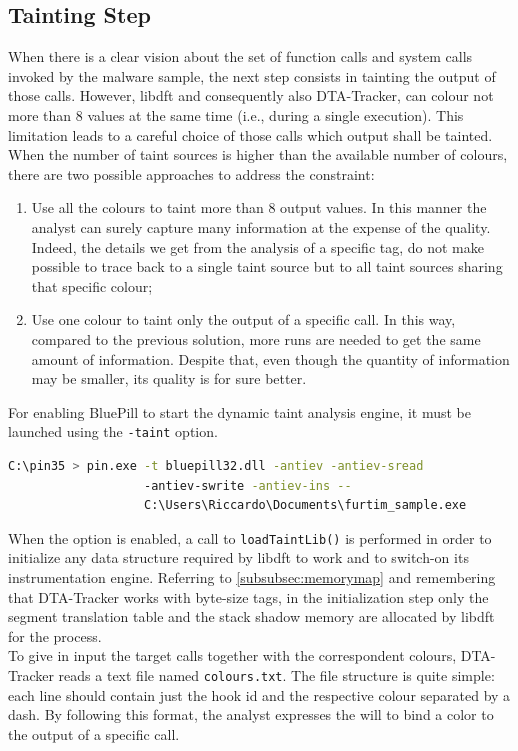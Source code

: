 \documentclass[LaM,binding=0.6cm]{sapthesis}
\begin{document}
\subsection{Tainting Step}
\label{subsec:taintingstep}
When there is a clear vision about the set of function calls and system calls invoked by the malware sample, the next step consists in tainting the output of those calls. However, libdft and consequently also DTA-Tracker, can colour not more than $8$ values at the same time (i.e., during a single execution). This limitation leads to a careful choice of those calls which output shall be tainted. When the number of taint sources is higher than the available number of colours, there are two possible approaches to address the constraint:
\begin{enumerate}
\item Use all the colours to taint more than $8$ output values. In this manner the analyst can surely capture many information at the expense of the quality. Indeed, the details we get from the analysis of a specific tag, do not make possible to trace back to a single taint source but to all taint sources sharing that specific colour;
\item Use one colour to taint only the output of a specific call. In this way, compared to the previous solution, more runs are needed to get the same amount of information. Despite that, even though the quantity of information may be smaller, its quality is for sure better.
\end{enumerate}
For enabling BluePill to start the dynamic taint analysis engine, it must be launched using the \texttt{-taint} option.
\begin{lstlisting}[language=bash]
C:\pin35 > pin.exe -t bluepill32.dll -antiev -antiev-sread 
				   -antiev-swrite -antiev-ins -- 
				   C:\Users\Riccardo\Documents\furtim_sample.exe
\end{lstlisting}
When the option is enabled, a call to \texttt{loadTaintLib()} is performed in order to initialize any data structure required by libdft to work and to switch-on its instrumentation engine. Referring to \autoref{subsubsec:memorymap} and remembering that DTA-Tracker works with byte-size tags, in the initialization step only the segment translation table and the stack shadow memory are allocated by libdft for the process.\\

To give in input the target calls together with the correspondent colours, DTA-Tracker reads a text file named \texttt{colours.txt}. The file structure is quite simple: each line should contain just the hook id and the respective colour separated by a dash. By following this format, the analyst expresses the will to bind a color to the output of a specific call.\\
\end{document}
